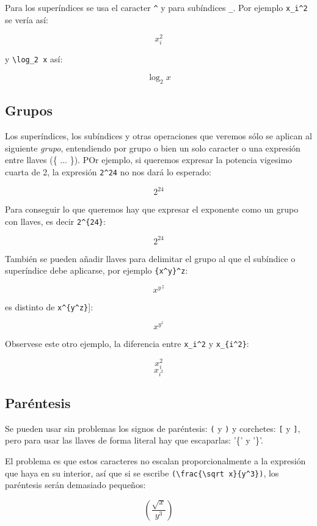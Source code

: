 \documentclass[11pt]{article}
\begin{document}
Para los superíndices se usa el caracter \texttt{\^{}} y para subíndices
\texttt{\_}. Por ejemplo \texttt{x\_i\^{}2} se vería así:

\[ x_i^2 \]

y \texttt{\textbackslash{}log\_2\ x} así:

\[ \log_2 x \]

    \subsection{Grupos}\label{grupos}

Los superíndices, los subíndices y otras operaciones que veremos sólo se
aplican al siguiente \emph{grupo}, entendiendo por grupo o bien un solo
caracter o una expresión entre llaves (\{ ... \}). POr ejemplo, si
queremos expresar la potencia vigesimo cuarta de 2, la expresión
\texttt{2\^{}24} no nos dará lo esperado:

\[ 2^24 \]

Para conseguir lo que queremos hay que expresar el exponente como un
grupo con llaves, es decir \texttt{2\^{}\{24\}}:

\[ 2^{24} \]

También se pueden añadir llaves para delimitar el grupo al que el
subíndice o superíndice debe aplicarse, por ejemplo
\texttt{\{x\^{}y\}\^{}z}:

\[{x^y}^z \]

es distinto de \texttt{x\^{}\{y\^{}z\}}{]}:

\[x^{y^z} \]

Observese este otro ejemplo, la diferencia entre \texttt{x\_i\^{}2} y
\texttt{x\_\{i\^{}2\}}:

\[ x_i^2 \] \[ x_{i^2} \]

    \subsection{Paréntesis}\label{paruxe9ntesis}

Se pueden usar sin problemas los signos de paréntesis: \texttt{(} y
\texttt{)} y corchetes: \texttt{{[}} y \texttt{{]}}, pero para usar las
llaves de forma literal hay que escaparlas: '\{' y '\}'.

El problema es que estos caracteres no escalan proporcionalmente a la
expresión que haya en su interior, así que si se escribe
\texttt{(\textbackslash{}frac\{\textbackslash{}sqrt\ x\}\{y\^{}3\})},
los paréntesis serán demasiado pequeños:

\[ (\frac{\sqrt x}{y^3}) \]
\end{document}
